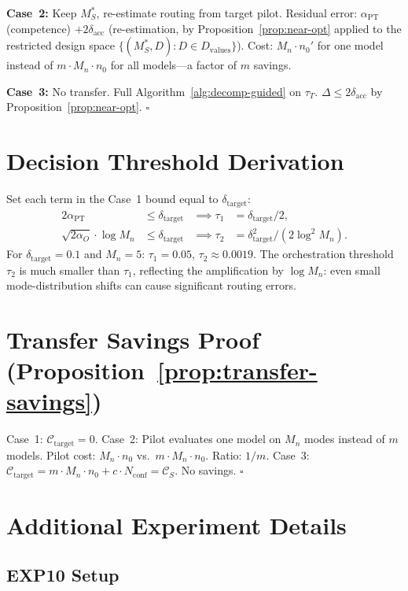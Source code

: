 \documentclass[11pt]{article}
\newcommand{\Mn}{M_n}
\newcommand{\dacc}{\delta_{\mathrm{acc}}}
\newcommand{\dtarget}{\delta_{\mathrm{target}}}
\newcommand{\qed}{\hfill\(\square\)}
\begin{document}
\textbf{Case~2:}
Keep $M_S^*$, re-estimate routing from target pilot.
Residual error: $\alpha_{\mathrm{PT}}$ (competence) $+ 2\dacc$
(re-estimation, by Proposition~\ref{prop:near-opt} applied to the
restricted design space $\{(M_S^*, D) : D \in D_{\mathrm{values}}\}$).
Cost: $\Mn \cdot n_0'$ for one model instead of $m \cdot \Mn \cdot n_0$
for all models---a factor of $m$ savings.

\textbf{Case~3:}
No transfer. Full Algorithm~\ref{alg:decomp-guided} on $\tau_T$.
$\Delta \le 2\dacc$ by Proposition~\ref{prop:near-opt}. \qed

\section{Decision Threshold Derivation}
\label{app:thresholds}

Set each term in the Case~1 bound equal to $\dtarget$:
\begin{align}
  2\alpha_{\mathrm{PT}} &\le \dtarget
    &\implies \tau_1 &= \dtarget/2, \\
  \sqrt{2\alpha_O}\cdot\log\Mn &\le \dtarget
    &\implies \tau_2 &= \dtarget^2/(2\log^2\Mn).
\end{align}
For $\dtarget = 0.1$ and $\Mn = 5$:
$\tau_1 = 0.05$, $\tau_2 \approx 0.0019$.
The orchestration threshold $\tau_2$ is much smaller than $\tau_1$,
reflecting the amplification by $\log\Mn$: even small mode-distribution
shifts can cause significant routing errors.

\section{Transfer Savings Proof (Proposition~\ref{prop:transfer-savings})}
\label{app:transfer-savings}

Case~1: $\mathcal{C}_{\mathrm{target}} = 0$.
Case~2: Pilot evaluates one model on $\Mn$ modes instead of $m$ models.
Pilot cost: $\Mn \cdot n_0$ vs.\ $m \cdot \Mn \cdot n_0$.
Ratio: $1/m$.
Case~3: $\mathcal{C}_{\mathrm{target}} = m \cdot \Mn \cdot n_0 +
c \cdot N_{\mathrm{conf}} = \mathcal{C}_S$. No savings. \qed

\section{Additional Experiment Details}
\label{app:experiments}

\subsection{EXP10 Setup}
\end{document}
